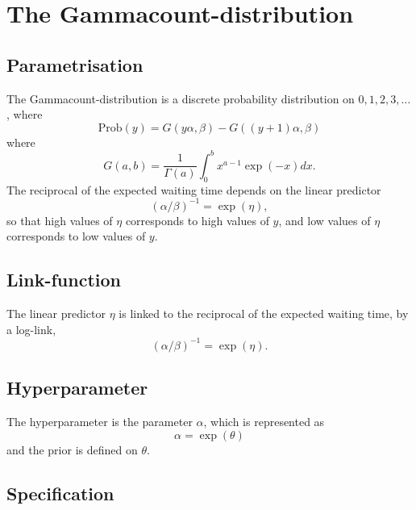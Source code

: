 \documentclass[a4paper,11pt]{article}
\begin{document}
\section*{The Gammacount-distribution}

\subsection*{Parametrisation}

The Gammacount-distribution is a discrete probability distribution on
$0, 1, 2, 3, \ldots$,  where
\begin{displaymath}
    \text{Prob}(y) = G(y\alpha, \beta) - G((y+1)\alpha, \beta)
\end{displaymath}
where
\begin{displaymath}
    G(a, b) = \frac{1}{\Gamma(a)} \int_0^{b} x^{a-1}\exp(-x) dx.
\end{displaymath}
The reciprocal of the expected waiting time depends on the linear
predictor
\begin{displaymath}
    (\alpha/\beta)^{-1} = \exp(\eta),
\end{displaymath}
so that high values of $\eta$ corresponds to high values of $y$, and
low values of $\eta$ corresponds to low values of $y$.

\subsection*{Link-function}

The linear predictor $\eta$ is linked to the reciprocal of the
expected waiting time, by a log-link,
\begin{displaymath}
    (\alpha/\beta)^{-1} = \exp(\eta).
\end{displaymath}

\subsection*{Hyperparameter}

The hyperparameter is the parameter $\alpha$, which is
represented as
\begin{displaymath}
    \alpha = \exp(\theta)
\end{displaymath}
and the prior is defined on $\theta$.

\subsection*{Specification}
\end{document}
